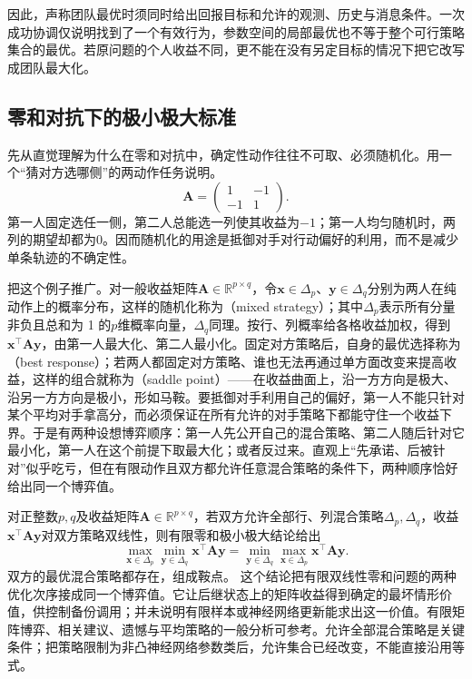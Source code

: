 因此，声称团队最优时须同时给出回报目标和允许的观测、历史与消息条件。一次成功协调仅说明找到了一个有效行为，参数空间的局部最优也不等于整个可行策略集合的最优。若原问题的个人收益不同，更不能在没有另定目标的情况下把它改写成团队最大化。

\subsection{零和对抗下的极小极大标准}
\label{sec:rl-multi-agent-minimax}

先从直觉理解为什么在零和对抗中，确定性动作往往不可取、必须随机化。用一个“猜对方选哪侧”的两动作任务说明。
\begin{equation}
 \bm A=
 \begin{pmatrix}1&-1\\-1&1\end{pmatrix}.
 \label{eq:rl-multi-agent-matching}
\end{equation}
第一人固定选任一侧，第二人总能选一列使其收益为$-1$；第一人均匀随机时，两列的期望却都为0。因而随机化的用途是抵御对手对行动偏好的利用，而不是减少单条轨迹的不确定性。

把这个例子推广。对一般收益矩阵$\bm A\in\mathbb R^{p\times q}$，令$\bm x\in\Delta_p$、$\bm y\in\Delta_q$分别为两人在纯动作上的概率分布，这样的随机化称为（mixed strategy）；其中$\Delta_p$表示所有分量非负且总和为 1 的$p$维概率向量，$\Delta_q$同理。按行、列概率给各格收益加权，得到$\bm x^\top\bm A\bm y$，由第一人最大化、第二人最小化。固定对方策略后，自身的最优选择称为（best response）；若两人都固定对方策略、谁也无法再通过单方面改变来提高收益，这样的组合就称为（saddle point）——在收益曲面上，沿一方方向是极大、沿另一方方向是极小，形如马鞍。要抵御对手利用自己的偏好，第一人不能只针对某个平均对手拿高分，而必须保证在所有允许的对手策略下都能守住一个收益下界。于是有两种设想博弈顺序：第一人先公开自己的混合策略、第二人随后针对它最小化，第一人在这个前提下取最大化；或者反过来。直观上“先承诺、后被针对”似乎吃亏，但在有限动作且双方都允许任意混合策略的条件下，两种顺序恰好给出同一个博弈值。

对正整数$p,q$及收益矩阵$\bm A\in\mathbb R^{p\times q}$，若双方允许全部行、列混合策略$\Delta_p,\Delta_q$，收益$\bm x^\top\bm A\bm y$对双方策略双线性，则有限零和极小极大结论给出
\[
 \max_{\bm x\in\Delta_p}\min_{\bm y\in\Delta_q}\bm x^\top\bm A\bm y
 =\min_{\bm y\in\Delta_q}\max_{\bm x\in\Delta_p}\bm x^\top\bm A\bm y.
\]
双方的最优混合策略都存在，组成鞍点。
这个结论把有限双线性零和问题的两种优化次序接成同一个博弈值。它让后继状态上的矩阵收益得到确定的最坏情形价值，供控制备份调用；并未说明有限样本或神经网络更新能求出这一价值。有限矩阵博弈、相关建议、遗憾与平均策略的一般分析可参考。允许全部混合策略是关键条件；把策略限制为非凸神经网络参数类后，允许集合已经改变，不能直接沿用等式。

